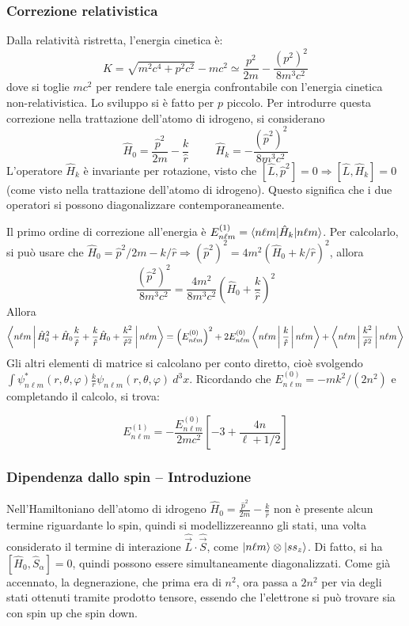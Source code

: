 \documentclass[11pt, a4paper]{scrartcl} %
\numberwithin{equation}{subsection}
\theoremstyle{style2}
\theoremstyle{style1}
\newenvironment{boxenv}[1][]{
    \begin{eqbox}[#1]
    }{
   \end{eqbox}
}
\begin{document}
\subsubsection{Correzione relativistica}
Dalla relativit\`a ristretta, l'energia cinetica \`e:
\[
K = \sqrt{m^2 c^4 + p^2 c^2} - mc^2 \simeq \frac{p^2}{2m}- \frac{(p^2)^2}{8m^3c^2}
\] 
dove si toglie $mc^2$ per rendere tale energia confrontabile con l'energia cinetica non-relativistica.
Lo sviluppo si \`e fatto per $p$ piccolo.
Per introdurre questa correzione nella trattazione dell'atomo di idrogeno, si considerano
\[
\hat{H}_0 = \frac{\hat{p}^2}{2m}- \frac{k}{\hat{r}} \hspace{1cm}\hat{H}_k = - \frac{(\hat{p}^2)^2}{8m^3c^2}
\] 
L'operatore $\hat{H}_k$ \`e invariante per rotazione, visto che $[\hat{L},\hat{p}^2] =0\Rightarrow [\hat{L},\hat{H}_k] = 0$ (come visto nella trattazione dell'atomo di idrogeno).
Questo significa che i due operatori si possono diagonalizzare contemporaneamente.

Il primo ordine di correzione all'energia \`e $E^{(1)} _{n\ell m}=\braket{n\ell m|\hat{H}_k|n\ell m}  $.
Per calcolarlo, si pu\`o usare che $\hat{H}_0 = \hat{p}^2 / 2m - k / \hat{r}\Rightarrow (\hat{p}^2)^2 = 4m^2 \left(\hat{H}_0+ k / \hat{r}\right) ^2$, allora
\[
\frac{(\hat{p}^2)^2}{8m^3c^2}= \frac{4m^2}{8m^3c^2}\left(\hat{H}_0+\frac{k}{\hat{r}}\right) ^2
\] 
Allora
\[
\Braket{n\ell m|\hat{H}_0^2 + \hat{H}_0 \frac{k}{\hat{r}} + \frac{k}{\hat{r}}\hat{H}_0 + \frac{k^2}{\hat{r}^2}|n\ell m} =\left(E^{(0)} _{n\ell m}\right)  ^2 + 2 E^{(0)} _{n\ell m} \Braket{n\ell m|\frac{k}{\hat{r}}|n\ell m} + \Braket{n\ell m|\frac{k^2}{\hat{r}^2}|n\ell m} 
\] 
Gli altri elementi di matrice si calcolano per conto diretto, cio\`e svolgendo $\int \psi _{n\ell m} ^*(r,\theta ,\varphi ) \frac{k}{r} \psi _{n\ell m} (r,\theta ,\varphi ) \ d^3 x $.
Ricordando che $E^{(0)} _{n\ell m} = -mk^2/(2n^2)$ e completando il calcolo, si trova:
\begin{boxenv}[]
\begin{equation}
	E_{n\ell m} ^{(1)} =- \frac{E_{n\ell m} ^{(0)} }{2mc^2}\left[ -3 +\frac{4n}{\ell + 1 / 2} \right] 
\end{equation}
\end{boxenv}
\subsubsection{Dipendenza dallo spin -- Introduzione}
Nell'Hamiltoniano dell'atomo di idrogeno $\hat{H}_0= \frac{\hat{p}^2}{2m}-  \frac{k}{\hat{r}}$ non \`e presente alcun termine riguardante lo spin, quindi si modellizzereanno gli stati, una volta considerato il termine di interazione $\hat{\vec{L}} \cdot \hat{\vec{S}}$, come $\ket{n\ell m} \otimes \ket{ss_z} $. 
Di fatto, si ha $[\hat{H}_0, \hat{S}_\alpha ] = 0$, quindi possono essere simultaneamente diagonalizzati.
Come gi\`a accennato, la degnerazione, che prima era di $n^2$, ora passa a $2n^2$ per via degli stati ottenuti tramite prodotto tensore, essendo che l'elettrone si pu\`o trovare sia con spin up che spin down.
\end{document}
